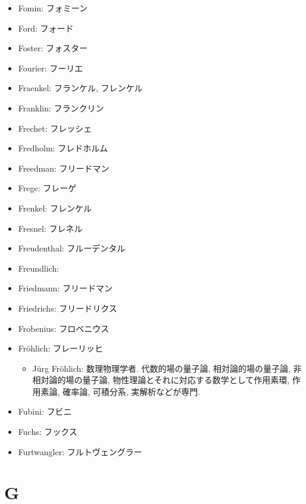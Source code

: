 \documentclass[openany, a4paper, oneside]{jsbook}
\begin{document}
\begin{itemize}
\item Fomin: フォミーン
\item Ford: フォード
\item Foster: フォスター
\item Fourier: フーリエ
\item Fraenkel: フランケル, フレンケル
\item Franklin: フランクリン
\item Frechet: フレッシェ
\item Fredholm: フレドホルム
\item Freedman: フリードマン
\item Frege: フレーゲ
\item Frenkel: フレンケル
\item Fresnel: フレネル
\item Freudenthal: フルーデンタル
\item Freundlich:
\item Friedmann: フリードマン
\item Friedrichs: フリードリクス
\item Frobenius: フロベニウス
\item Fr\"ohlich: フレーリッヒ
\begin{itemize}
\item J\"urg Fr\"ohlich: 数理物理学者. 代数的場の量子論, 相対論的場の量子論, 非相対論的場の量子論, 物性理論とそれに対応する数学として作用素環, 作用素論, 確率論, 可積分系, 実解析などが専門.
\end{itemize}
\item Fubini: フビニ
\item Fuchs: フックス
\item Furtwangler: フルトヴェングラー
\end{itemize}
\section{G}
\end{document}
